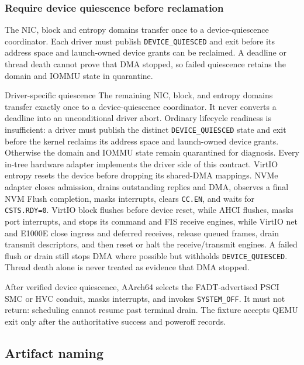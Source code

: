\subsubsection{Require device quiescence before reclamation}

The NIC, block and entropy domains transfer once to a device-quiescence
coordinator. Each driver must publish \texttt{DEVICE\_QUIESCED} and exit before
its address space and launch-owned device grants can be reclaimed. A deadline
or thread death cannot prove that DMA stopped, so failed quiescence retains the
domain and IOMMU state in quarantine.

\begin{implementationdetail}{Driver-specific quiescence}
The remaining NIC, block, and entropy domains transfer exactly once to a
device-quiescence coordinator. It never converts a deadline into an
unconditional driver abort. Ordinary lifecycle readiness is insufficient: a
driver must publish the distinct \texttt{DEVICE\_QUIESCED} state and exit before
the kernel reclaims its address space and launch-owned device grants. Otherwise
the domain and IOMMU state remain quarantined for diagnosis. Every in-tree
hardware adapter implements the driver side of this contract. VirtIO entropy
resets the device before dropping its shared-DMA mappings. NVMe
adapter closes admission, drains outstanding replies and DMA, observes a final
NVM Flush completion, masks interrupts, clears \texttt{CC.EN}, and waits for
\texttt{CSTS.RDY=0}. VirtIO block flushes before device reset, while AHCI flushes,
masks port interrupts, and stops its command and FIS receive engines, while VirtIO
net and E1000E close ingress and deferred receives, release queued frames,
drain transmit descriptors, and then reset or halt the receive/transmit
engines. A failed flush or drain still stops DMA where possible but withholds
\texttt{DEVICE\_QUIESCED}. Thread death alone is never treated as evidence
that DMA stopped.
\end{implementationdetail}

After verified device quiescence, AArch64 selects the FADT-advertised PSCI SMC
or HVC conduit, masks interrupts, and invokes \texttt{SYSTEM\_OFF}. It must not
return: scheduling cannot resume past terminal drain. The fixture accepts QEMU
exit only after the authoritative success and poweroff records.

\subsection{Artifact naming}


